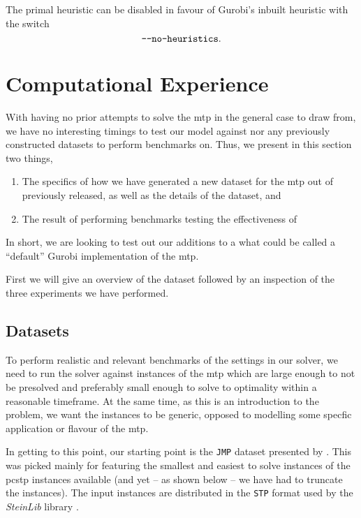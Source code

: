 The primal heuristic can be disabled in favour of Gurobi's inbuilt heuristic with
the switch $$\texttt{-{}-no-heuristics}\mathnormal{.}$$
\section{Computational Experience}
With having no prior attempts to solve the \gls{mtp} in the general case to draw from,
we have no interesting timings to test our model against nor any previously constructed
datasets to perform benchmarks on. Thus, we present in this section two things,
\begin{enumerate}
\item The specifics of how we have generated a new dataset for the \gls{mtp} out of previously released,
  as well as the details of the dataset, and
\item The result of performing benchmarks testing the effectiveness of
\end{enumerate}
In short, we are looking to test out our additions to a what could be called a ``default'' Gurobi
implementation of the \gls{mtp}.

First we will give an overview of the dataset followed by an inspection of the three experiments we have
 performed.
 \subsection{Datasets}
 To perform realistic and relevant benchmarks of the settings in our solver, we need to run the solver
 against instances of the \gls{mtp} which are large enough to not be presolved and preferably small
 enough to solve to optimality within a reasonable timeframe. At the same time, as this is an introduction
 to the problem, we want the instances to be generic, opposed to modelling some specfic application or
 flavour of the \gls{mtp}.

 In getting to this point, our starting point is the \texttt{JMP} dataset presented by 
 \citet{Johnson:2000:PCS:338219.338637}. This was picked mainly for featuring the smallest
 and easiest to solve instances of the \gls{pcstp} instances available
 (and yet -- as shown below -- we have had to truncate the instances).
 The input instances are distributed in the \texttt{STP} format used by the \textit{SteinLib}
 library \citep{koch2001steinlib}.

